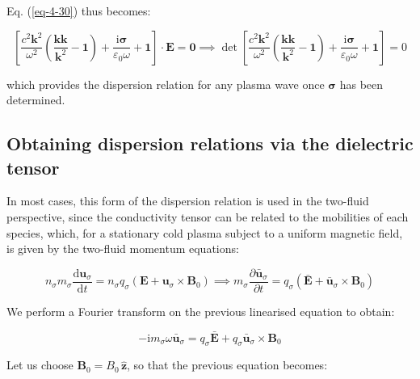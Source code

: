 Eq. (\ref{eq-4-30}) thus becomes:

\begin{equation}
    \left[\frac{c^2\mathbf{k}^2}{\omega^2}\left(\frac{\mathbf{kk}}{\mathbf{k}^2}-\mathbf{1}\right)+\frac{\mathrm{i}\boldsymbol{\sigma}}{\varepsilon_0\omega}+\mathbf{1}\right]\cdot\mathbf{E}=\mathbf{0}\implies\det{\left[\frac{c^2\mathbf{k}^2}{\omega^2}\left(\frac{\mathbf{kk}}{\mathbf{k}^2}-\mathbf{1}\right)+\frac{\mathrm{i}\boldsymbol{\sigma}}{\varepsilon_0\omega}+\mathbf{1}\right]}=0
\end{equation}

which provides the dispersion relation for any plasma wave once $\boldsymbol{\sigma}$ has been determined.

\subsection{Obtaining dispersion relations via the dielectric tensor}

In most cases, this form of the dispersion relation is used in the two-fluid perspective, since the conductivity tensor can be related to the mobilities of each species, which, for a stationary cold plasma subject to a uniform magnetic field, is given by the two-fluid momentum equations:

\begin{equation}
    n_\sigma m_\sigma\frac{\mathrm{d}\mathbf{u}_\sigma}{\mathrm{d}t}=n_\sigma q_\sigma(\mathbf{E}+\mathbf{u}_\sigma\times\mathbf{B}_0)\implies m_\sigma\frac{\partial\bar{\mathbf{u}}_\sigma}{\partial t}=q_\sigma(\bar{\mathbf{E}}+\bar{\mathbf{u}}_\sigma\times\mathbf{B}_0)
\end{equation}

We perform a Fourier transform on the previous linearised equation to obtain:

\begin{equation}
    -\mathrm{i}m_\sigma\omega\bar{\mathbf{u}}_\sigma=q_\sigma\bar{\mathbf{E}}+q_\sigma\bar{\mathbf{u}}_\sigma\times\mathbf{B}_0
\end{equation}

Let us choose $\mathbf{B}_0=B_0\,\mathbf{\hat{z}}$, so that the previous equation becomes:

